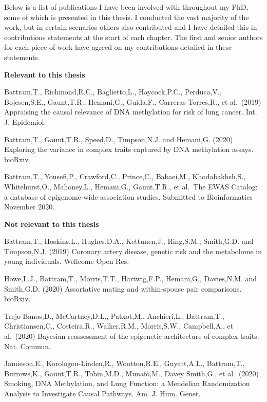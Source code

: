 \documentclass[11pt,twoside]{bristolthesis}
\begin{document}
  \begin{publications}
    Below is a list of publications I have been involved with throughout my PhD, some of which is presented in this thesis. I conducted the vast majority of the work, but in certain scenarios others also contributed and I have detailed this in contributions statements at the start of each chapter. The first and senior authors for each piece of work have agreed on my contributions detailed in these statements.

    \textbf{Relevant to this thesis}

    Battram,T., Richmond,R.C., Baglietto,L., Haycock,P.C., Perduca,V., Bojesen,S.E., Gaunt,T.R., Hemani,G., Guida,F., Carreras-Torres,R., et al.~(2019) Appraising the causal relevance of DNA methylation for risk of lung cancer. Int. J. Epidemiol.

    Battram,T., Gaunt,T.R., Speed,D., Timpson,N.J. and Hemani,G. (2020) Exploring the variance in complex traits captured by DNA methylation assays. bioRxiv

    Battram,T., Yousefi,P., Crawford,C., Prince,C., Babaei,M., Khodabakhsh,S., Whitehurst,O., Mahoney,L., Hemani,G., Gaunt,T.R., et al.~The EWAS Catalog: a database of epigenome-wide association studies. Submitted to Bioinformatics November 2020.

    \textbf{Not relevant to this thesis}

    Battram,T., Hoskins,L., Hughes,D.A., Kettunen,J., Ring,S.M., Smith,G.D. and Timpson,N.J. (2019) Coronary artery disease, genetic risk and the metabolome in young individuals. Wellcome Open Res.

    Howe,L.J., Battram,T., Morris,T.T., Hartwig,F.P., Hemani,G., Davies,N.M. and Smith,G.D. (2020) Assortative mating and within-spouse pair comparisons. bioRxiv.

    Trejo Banos,D., McCartney,D.L., Patxot,M., Anchieri,L., Battram,T., Christiansen,C., Costeira,R., Walker,R.M., Morris,S.W., Campbell,A., et al.~(2020) Bayesian reassessment of the epigenetic architecture of complex traits. Nat. Commun.

    Jamieson,E., Korologou-Linden,R., Wootton,R.E., Guyatt,A.L., Battram,T., Burrows,K., Gaunt,T.R., Tobin,M.D., Munafò,M., Davey Smith,G., et al.~(2020) Smoking, DNA Methylation, and Lung Function: a Mendelian Randomization Analysis to Investigate Causal Pathways. Am. J. Hum. Genet.
  \end{publications}
\end{document}

